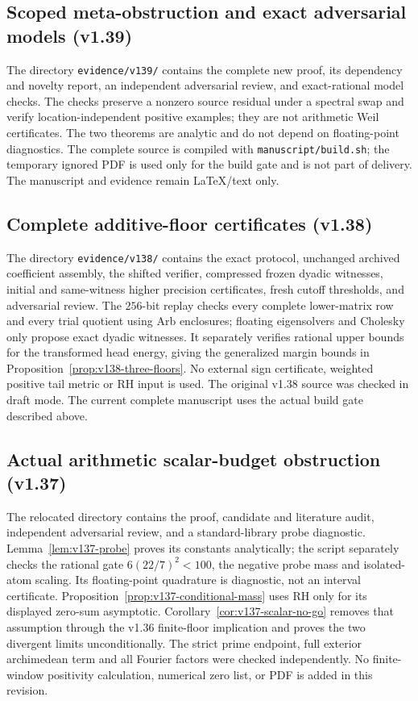 \documentclass[11pt]{article}
\theoremstyle{remark}
\begin{document}
\subsection{Scoped meta-obstruction and exact adversarial models (v1.39)}
The directory \texttt{evidence/v139/} contains the complete new proof,
its dependency and novelty report, an independent adversarial review,
and exact-rational model checks. The checks preserve a nonzero source
residual under a spectral swap and verify location-independent positive
examples; they are not arithmetic Weil certificates. The two theorems
are analytic and do not depend on floating-point diagnostics.
The complete source is compiled with \texttt{manuscript/build.sh};
the temporary ignored PDF is used only for the build gate and is not
part of delivery. The manuscript and evidence remain LaTeX/text only.

\subsection{Complete additive-floor certificates (v1.38)}
The directory \texttt{evidence/v138/} contains the exact protocol,
unchanged archived coefficient assembly, the shifted verifier,
compressed frozen dyadic witnesses, initial and same-witness higher
precision certificates, fresh cutoff thresholds, and adversarial review.
The $256$-bit replay checks every complete lower-matrix row and every
trial quotient using Arb enclosures; floating eigensolvers and Cholesky
only propose exact dyadic witnesses. It separately verifies rational
upper bounds for the transformed head energy, giving the generalized
margin bounds in Proposition~\ref{prop:v138-three-floors}. No external
sign certificate, weighted positive tail metric or RH input is used.
The original v1.38 source was checked in draft mode. The current
complete manuscript uses the actual build gate described above.

\subsection{Actual arithmetic scalar-budget obstruction (v1.37)}
The relocated directory  contains the proof,
candidate and literature audit, independent adversarial review, and a
standard-library probe diagnostic. Lemma~\ref{lem:v137-probe} proves its
constants analytically; the script separately checks the rational gate
$6(22/7)^2<100$, the negative probe mass and isolated-atom scaling.
Its floating-point quadrature is diagnostic, not an interval certificate.
Proposition~\ref{prop:v137-conditional-mass} uses RH only for its displayed
zero-sum asymptotic. Corollary~\ref{cor:v137-scalar-no-go} removes that
assumption through the v1.36 finite-floor implication and proves the two
divergent limits unconditionally. The strict prime endpoint, full exterior
archimedean term and all Fourier factors were checked independently.
No finite-window positivity calculation, numerical zero list, or PDF is
added in this revision.
\end{document}
